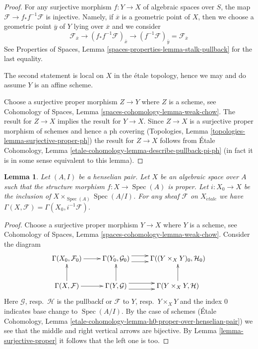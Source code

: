 \documentclass[10pt,a4paper]{amsart}
\theoremstyle{plain}
\newtheorem{lemma}[subsection]{Lemma}
\theoremstyle{definition}
\theoremstyle{remark}
\numberwithin{equation}{subsection}
\def\Spec{\mathop{\mathrm{Spec}}}
\def\etale{{\acute{e}tale}}
\begin{document}
\begin{proof}
For any surjective morphism $f : Y \to X$ of algebraic spaces over $S$,
the map $\mathcal{F} \to f_*f^{-1}\mathcal{F}$ is injective.
Namely, if $\overline{x}$ is a geometric point of $X$, then we
choose a geometric point $\overline{y}$ of $Y$ lying over $\overline{x}$
and we consider
$$
\mathcal{F}_{\overline{x}} \to
(f_*f^{-1}\mathcal{F})_{\overline{x}} \to
(f^{-1}\mathcal{F})_{\overline{y}} = \mathcal{F}_{\overline{x}}
$$
See Properties of Spaces, Lemma \ref{spaces-properties-lemma-stalk-pullback}
for the last equality.

\medskip\noindent
The second statement is local on $X$ in the \'etale topology, hence we may
and do assume $Y$ is an affine scheme.

\medskip\noindent
Choose a surjective proper morphism $Z \to Y$ where $Z$ is a scheme, see
Cohomology of Spaces, Lemma \ref{spaces-cohomology-lemma-weak-chow}.
The result for $Z \to X$ implies the result for $Y \to X$.
Since $Z \to X$ is a surjective proper morphism of schemes
and hence a ph covering
(Topologies, Lemma \ref{topologies-lemma-surjective-proper-ph})
the result for $Z \to X$ follows from
\'Etale Cohomology, Lemma \ref{etale-cohomology-lemma-describe-pullback-pi-ph}
(in fact it is in some sense equivalent to this lemma).
\end{proof}

\begin{lemma}
\label{lemma-h0-proper-over-henselian-pair}
Let $(A, I)$ be a henselian pair. Let $X$ be an algebraic space over $A$
such that the structure morphism $f : X \to \Spec(A)$ is proper.
Let $i : X_0 \to X$ be the inclusion of $X \times_{\Spec(A)} \Spec(A/I)$.
For any sheaf $\mathcal{F}$ on $X_\etale$ we
have $\Gamma(X, \mathcal{F}) = \Gamma(X_0, i^{-1}\mathcal{F})$.
\end{lemma}

\begin{proof}
Choose a surjective proper morphism $Y \to X$ where $Y$ is a scheme, see
Cohomology of Spaces, Lemma \ref{spaces-cohomology-lemma-weak-chow}.
Consider the diagram
$$
\xymatrix{
\Gamma(X_0, \mathcal{F}_0) \ar[r] &
\Gamma(Y_0, \mathcal{G}_0) \ar@<1ex>[r] \ar@<-1ex>[r] &
\Gamma((Y \times_X Y)_0, \mathcal{H}_0) \\
\Gamma(X, \mathcal{F}) \ar[r] \ar[u] &
\Gamma(Y, \mathcal{G}) \ar@<1ex>[r] \ar@<-1ex>[r] \ar[u] &
\Gamma(Y \times_X Y, \mathcal{H}) \ar[u]
}
$$
Here $\mathcal{G}$, resp.\ $\mathcal{H}$ is the pullbackf or
$\mathcal{F}$ to $Y$, resp.\ $Y \times_X Y$ and the index $0$
indicates base change to $\Spec(A/I)$. By the case of schemes
(\'Etale Cohomology, Lemma
\ref{etale-cohomology-lemma-h0-proper-over-henselian-pair})
we see that the middle and right vertical arrows are bijective.
By Lemma \ref{lemma-surjective-proper} it follows that the left one is too.
\end{proof}
\end{document}
